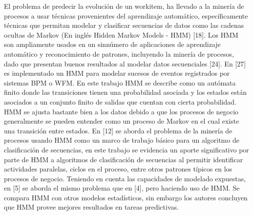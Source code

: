El problema de predecir la evolución de un workitem, ha llevado a la minería de procesos a usar técnicas provenientes del aprendizaje automático, específicamente técnicas que permitan modelar y clasificar secuencias de datos como las cadenas ocultas de Markov (En inglés Hidden Markov Models - HMM) [18]. Los HMM son ampliamente usados en un sinnúmero de aplicaciones de aprendizaje automático y reconocimiento de patrones, incluyendo la minería de procesos, dado que presentan buenos resultados al modelar datos secuenciales [24]. En [27] es implementado un HMM para modelar sucesos de eventos registrados por sistemas BPM o WFM. En este trabajo HMM se describe como un autómata finito donde las transiciones tienen una probabilidad asociada y los estados están asociados a un conjunto finito de salidas que cuentan con cierta probabilidad. HMM se ajusta bastante bien a los datos debido a que los procesos de negocio generalmente se pueden entender como un proceso de Markov en el cual existe una transición entre estados. En [12] se aborda el problema de la minería de procesos usando HMM como un marco de trabajo básico para un algoritmo de clasificación de secuencias, en este trabajo se evidencia un aporte significativo por parte de HMM a algoritmos de clasificación de secuencias al permitir identificar actividades paralelas, ciclos en el proceso, entre otros patrones típicos en los procesos de negocio. Teniendo en cuenta las capacidades de modelado expuestas, en [5] se aborda el mismo problema que en [4], pero haciendo uso de HMM. Se compara HMM con otros modelos estadísticos, sin embargo los autores concluyen que HMM provee mejores resultados en tareas predictivas.

